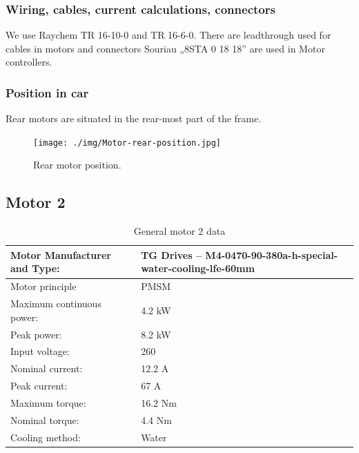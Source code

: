 \subsubsection{Wiring, cables, current calculations, connectors}
We use Raychem TR 16-10-0 and TR 16-6-0. There are leadthrough used for cables in motors and connectors Souriau „8STA 0 18 18” are used in Motor controllers.

\subsubsection{Position in car}

Rear motors are situated in the rear-most part of the frame.
\begin{figure}[H]
	\centering
	\texttt{[image: ./img/Motor-rear-position.jpg]}
	\caption{Rear motor position.}
	\label{fig:Motor-rear-position}
\end{figure}

\subsection{Motor 2}%

\begin{table}[H]
	\centering
	\caption{General motor 2 data}
	\begin{tabu}{|X|X|}\hline
		Motor Manufacturer and Type: & TG Drives – M4-0470-90-380a-h-special-water-cooling-lfe-60mm \\\hline
		Motor principle & PMSM \\\hline
		Maximum continuous power: & 4.2 kW \\\hline
		Peak power: & 8.2 kW \\\hline
		Input voltage: & 260 \vac \\\hline
		Nominal current: & 12.2 A \\\hline
		Peak current: & 67 A \\\hline
		Maximum torque: & 16.2 Nm \\\hline
		Nominal torque: & 4.4 Nm \\\hline
		Cooling method: & Water \\\hline
	\end{tabu}%
	\label{tab:motors2-general}%
\end{table}%

